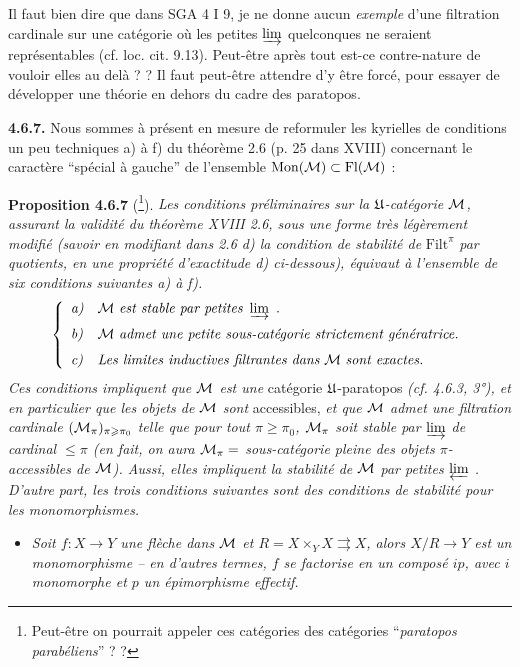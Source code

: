 Il faut bien dire que dans SGA 4 I 9, je ne donne aucun \textit{exemple} d'une filtration cardinale sur une catégorie où les petites $\varinjlim$ quelconques ne seraient représentables (cf. loc. cit. 9.13). Peut-être après tout est-ce contre-nature de vouloir elles au delà ? ? Il faut peut-être attendre d'y être forcé, pour essayer de développer une théorie en dehors du cadre des paratopos.


\textbf{4.6.7.} Nous sommes à présent en mesure de reformuler les kyrielles de conditions un peu techniques a) à f) du théorème 2.6 (p. 25 dans XVIII) concernant le caractère “spécial à gauche” de l'ensemble $\mathrm{Mon}(\mathcal{M}) \subset \mathrm{Fl}(\mathcal{M})$ :

\textbf{Proposition 4.6.7} (\footnote[62]{Peut-être on pourrait appeler ces catégories des catégories “\textit{paratopos parabéliens}” ? ?}). \textit{Les conditions préliminaires sur la $\mathfrak{U}$-catégorie $\mathcal{M}$, assurant la validité du théorème XVIII 2.6, sous une forme très légèrement modifié (savoir en modifiant dans 2.6 d) la condition de stabilité de} $\mathrm{Filt}^{\pi}$ \textit{par quotients, en une propriété d'exactitude d) ci-dessous), équivaut à l'ensemble de six conditions suivantes a) à f).} %
\[
\left\{
\begin{array}{ll}
\textit{a)} & \Mc\ \textit{est stable par petites}\ \varinjlim\ . \\[1.5ex]
\textit{b)} & \Mc\ \textit{admet une petite sous-catégorie strictement génératrice.} \\[1.5ex]
\textit{c)} & \textit{Les limites inductives filtrantes dans}\ \Mc\ \textit{sont exactes.}
\end{array}
\right.
\]
\textit{Ces conditions impliquent que $\mathcal{M}$ est une} catégorie $\mathfrak{U}$-paratopos \textit{(cf. 4.6.3, 3°), et en particulier que les objets de $\mathcal{M}$ sont} accessibles, \textit{et que $\mathcal{M}$ admet une filtration cardinale $(\mathcal{M}_{\pi})_{\pi \geqslant \pi_0}$ telle que pour tout $\pi \geqslant \pi_0$, $\mathcal{M}_{\pi}$ soit stable par $\varinjlim$ de cardinal $\leqslant \pi$ (en fait, on aura $\mathcal{M}_{\pi} =$ sous-catégorie pleine des objets $\pi$-accessibles de $\mathcal{M}$). Aussi, elles impliquent la stabilité de $\mathcal{M}$ par petites $\varprojlim$ . D'autre part, les trois conditions suivantes sont des conditions de stabilité pour les monomorphismes.}
\begin{itemize}[leftmargin=4em]
\item[\textit{d)}] \textit{Soit $f : X \longrightarrow Y$ une flèche dans $\mathcal{M}$ et $R = X \times_Y X \rightrightarrows X$, alors $X/R \longrightarrow Y$ est un monomorphisme -- en d'autres termes, $f$ se factorise en un composé $ip$, avec $i$ monomorphe et $p$ un épimorphisme effectif.}
\end{itemize}

